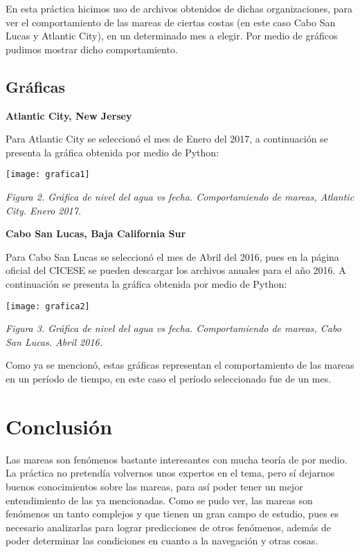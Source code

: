 \documentclass[12pt]{article}
\begin{document}
\begin{doublespace}
En esta práctica hicimos uso de archivos obtenidos de dichas organizaciones, para ver el comportamiento de las mareas de ciertas costas (en este caso Cabo San Lucas y Atlantic City), en un determinado mes a elegir. Por medio de gráficos pudimos mostrar dicho comportamiento. 

\subsection*{Gráficas}

\textbf{Atlantic City, New Jersey}

Para Atlantic City se seleccionó el mes de Enero del 2017, a continuación se presenta la gráfica obtenida por medio de Python:

\begin{center}
\texttt{[image: grafica1]}

\textit{Figura 2. Gráfica de nivel del agua vs fecha. Comportamiendo de mareas, Atlantic City. Enero 2017.}
\end{center}

\textbf{Cabo San Lucas, Baja California Sur}

Para Cabo San Lucas se seleccionó el mes de Abril del 2016, pues en la página oficial del CICESE se pueden descargar los archivos anuales para el año 2016. A continuación se presenta la gráfica obtenida por medio de Python:

\begin{center}
\texttt{[image: grafica2]}

\textit{Figura 3. Gráfica de nivel del agua vs fecha. Comportamiendo de mareas, Cabo San Lucas. Abril 2016.}
\end{center}

Como ya se mencionó, estas gráficas representan el comportamiento de las mareas en un período de tiempo, en este caso el período seleccionado fue de un mes.


\section*{Conclusión}
Las mareas son fenómenos bastante interesantes con mucha teoría de por medio. La práctica no pretendía volvernos unos expertos en el tema, pero sí dejarnos buenos conocimientos sobre las mareas, para así poder tener un mejor entendimiento de las ya mencionadas. Como se pudo ver, las mareas son fenómenos un tanto complejos y que tienen un gran campo de estudio, pues es necesario analizarlas para lograr predicciones de otros fenómenos, además de poder determinar las condiciones en cuanto a la navegación y otras cosas.


\end{doublespace}
\end{document}
